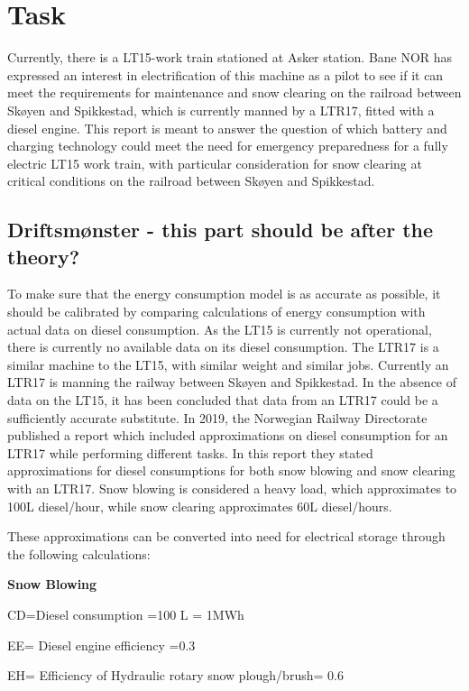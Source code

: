 \documentclass{article}
\begin{document}
\section{Task}

Currently, there is a LT15-work train stationed at Asker station. Bane NOR has expressed an interest in electrification of this machine as a pilot to see if it can meet the requirements for maintenance and snow clearing on the railroad between Skøyen and Spikkestad, which is currently manned by a LTR17, fitted with a diesel engine. This report is meant to answer the question of which battery and charging technology could meet the need for emergency preparedness for a fully electric LT15 work train, with particular consideration for snow clearing at critical conditions on the railroad between Skøyen and Spikkestad.

\subsection{Driftsmønster - this part should be after the theory?}

To make sure that the energy consumption model is as accurate as possible, it should be calibrated by comparing calculations of energy consumption with actual data on diesel consumption. As the LT15 is currently not operational, there is currently no available data on its diesel consumption. The LTR17 is a similar machine to the LT15, with similar weight and similar jobs. Currently an LTR17 is manning the railway between Skøyen and Spikkestad. In the absence of data on the LT15, it has been concluded that data from an LTR17 could be a sufficiently accurate substitute. In 2019, the Norwegian Railway Directorate published a report which included approximations on diesel consumption for an LTR17 while performing different tasks. In this report they stated approximations for diesel consumptions for both snow blowing and snow clearing with an LTR17. Snow blowing is considered a heavy load, which approximates to 100L diesel/hour, while snow clearing approximates 60L diesel/hours.

These approximations can be converted into need for electrical storage through the following calculations:

\textbf{Snow Blowing}

CD=Diesel consumption =100 L = 1MWh

EE= Diesel engine efficiency =0.3

EH= Efficiency of Hydraulic rotary snow plough/brush= 0.6
\end{document}
